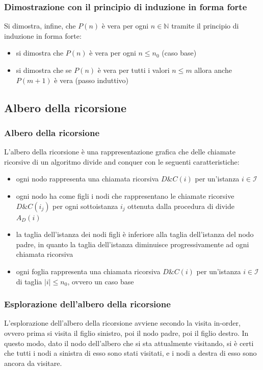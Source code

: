 \subsubsection*{Dimostrazione con il principio di induzione in forma forte}
Si dimostra, infine, che \(P(n)\) è vera per ogni \(n \in \mathbb{N}\) tramite il principio di induzione in forma forte:
\begin{itemize}
	\item si dimostra che \(P(n)\) è vera per ogni \(n \leq n_0\) (caso base)
	\item si dimostra che se \(P(n)\) è vera per tutti i valori \(n \leq m\) allora anche \(P(m + 1)\) è vera (passo induttivo)
\end{itemize}

\subsection{Albero della ricorsione}
\subsubsection*{Albero della ricorsione}
L'albero della ricorsione è una rappresentazione grafica che delle chiamate ricorsive di un algoritmo divide and
conquer con le seguenti caratteristiche:
\begin{itemize}
	\item ogni nodo rappresenta una chiamata ricorsiva \(D\&C(i)\) per un'istanza \(i \in \mathcal{I}\)
	\item ogni nodo ha come figli i nodi che rappresentano le chiamate ricorsive \(D\&C(i_j)\) per ogni sottoistanza
	\(i_j\) ottenuta dalla procedura di divide \(A_D(i)\)
	\item la taglia dell'istanza dei nodi figli è inferiore alla taglia dell'istanza del nodo padre, in quanto la taglia
	dell'istanza diminuisce progressivamente ad ogni chiamata ricorsiva
	\item ogni foglia rappresenta una chiamata ricorsiva \(D\&C(i)\) per un'istanza \(i \in \mathcal{I}\) di taglia
	\(|i| \leq n_0\), ovvero un caso base
\end{itemize}

\subsubsection*{Esplorazione dell'albero della ricorsione}
L'esplorazione dell'albero della ricorsione avviene secondo la visita in-order, ovvero prima si visita il figlio sinistro,
poi il nodo padre, poi il figlio destro. In questo modo, dato il nodo dell'albero che si sta attualmente visitando, si è
certi che tutti i nodi a sinistra di esso sono stati visitati, e i nodi a destra di esso sono ancora da visitare.

